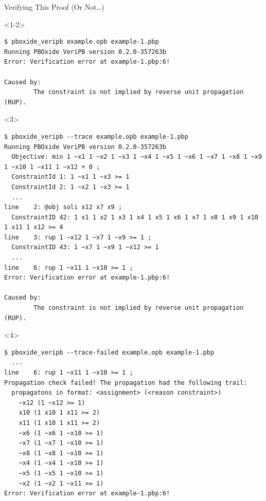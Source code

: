 \documentclass[aspectratio=169,compress,10pt]{beamer}
\begin{document}
\begin{frame}[fragile,t]{Verifying This Proof (Or Not\ldots)}
\begin{onlyenv}<1-2>\footnotesize
\begin{Verbatim}
$ pboxide_veripb example.opb example-1.pbp
Running PBOxide VeriPB version 0.2.0-357263b
Error: Verification error at example-1.pbp:6!

Caused by:
        The constraint is not implied by reverse unit propagation (RUP).
\end{Verbatim}
\end{onlyenv}\begin{onlyenv}<3>%
\begin{Verbatim}[commandchars=\\\{\},fontsize=\footnotesize]
$ pboxide_veripb --trace example.opb example-1.pbp
Running PBOxide VeriPB version 0.2.0-357263b
  Objective: min 1 ~x1 1 ~x2 1 ~x3 1 ~x4 1 ~x5 1 ~x6 1 ~x7 1 ~x8 1 ~x9 1 ~x10 1 ~x11 1 ~x12 + 0 ;
  ConstraintId 1: 1 ~x1 1 ~x3 >= 1
  ConstraintId 2: 1 ~x2 1 ~x3 >= 1
  ...
line    2: @obj soli x12 x7 x9 ;
  ConstraintID 42: 1 x1 1 x2 1 x3 1 x4 1 x5 1 x6 1 x7 1 x8 1 x9 1 x10 1 x11 1 x12 >= 4
line    3: rup 1 ~x12 1 ~x7 1 ~x9 >= 1 ;
  ConstraintID 43: 1 ~x7 1 ~x9 1 ~x12 >= 1
  ...
line    6: rup 1 ~x11 1 ~x10 >= 1 ;
Error: Verification error at example-1.pbp:6!

Caused by:
        The constraint is not implied by reverse unit propagation (RUP).
\end{Verbatim}
\end{onlyenv}\begin{onlyenv}<4>%
\begin{Verbatim}[commandchars=\\\{\},fontsize=\footnotesize]
$ pboxide_veripb --trace-failed example.opb example-1.pbp
  ...
line    6: rup 1 ~x11 1 ~x10 >= 1 ;
Propagation check failed! The propagation had the following trail:
  propagatons in format: <assignment> (<reason constraint>)
    ~x12 (1 ~x12 >= 1)
    x10 (1 x10 1 x11 >= 2)
    x11 (1 x10 1 x11 >= 2)
    ~x6 (1 ~x6 1 ~x10 >= 1)
    ~x7 (1 ~x7 1 ~x10 >= 1)
    ~x8 (1 ~x8 1 ~x10 >= 1)
    ~x4 (1 ~x4 1 ~x10 >= 1)
    ~x5 (1 ~x5 1 ~x10 >= 1)
    ~x2 (1 ~x2 1 ~x11 >= 1)
Error: Verification error at example-1.pbp:6!


\end{Verbatim}
\end{onlyenv}
\end{frame}
\end{document}
